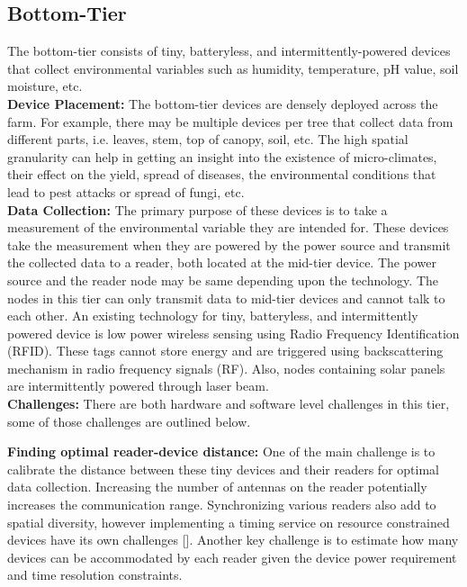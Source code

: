 \subsection{Bottom-Tier}
The bottom-tier consists of tiny, batteryless, and intermittently-powered devices that collect environmental variables such as humidity, temperature, pH value, soil moisture, etc. 
\\\textbf{Device Placement:} 
The bottom-tier devices are densely deployed across the farm. For example, there may be multiple devices per tree that collect data from different parts, i.e. leaves, stem, top of canopy, soil, etc. 
The high spatial granularity can help in getting an insight into the existence of micro-climates, their effect on the yield, spread of diseases, the environmental conditions that lead to pest attacks or spread of fungi, etc.  
\\\textbf{Data Collection:} 
The primary purpose of these devices is to take a measurement of the environmental variable they are intended for. These devices take the measurement when they are powered by the power source and transmit the collected data to a reader, both located at the mid-tier device. The power source and the reader node may be same depending upon the technology. The nodes in this tier can only transmit data to mid-tier devices and cannot talk to each other. An existing technology for tiny, batteryless, and intermittently powered device is low power wireless sensing using Radio Frequency Identification (RFID). These tags cannot store energy and are triggered
using backscattering mechanism in radio frequency signals (RF). Also, nodes containing solar panels are intermittently powered through laser beam. 
\\\textbf{Challenges:} 
There are both hardware and software level challenges in this tier, some of those challenges are outlined below. 

\noindent
\textbf{Finding optimal reader-device distance:}
One of the main challenge is to calibrate the distance between these tiny devices and their readers for optimal data collection. Increasing the number of antennas on the reader potentially increases the communication range. Synchronizing various readers also add to spatial diversity, however implementing a timing service on resource constrained devices have its own challenges []. Another key challenge is to estimate how many devices can be accommodated by each reader given the device power requirement and time resolution constraints.   

